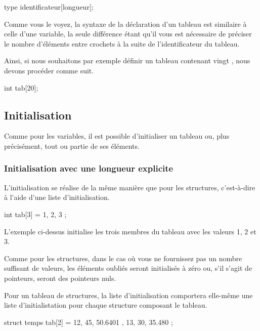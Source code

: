 \begin{C}
type identificateur[longueur];
\end{C}

Comme vous le voyez, la syntaxe de la déclaration d'un tableau est
similaire à celle d'une variable, la seule différence étant qu'il vous
est nécessaire de préciser le nombre d'éléments entre crochets à la
suite de l'identificateur du tableau.

Ainsi, si nous souhaitons par exemple définir un tableau contenant vingt
, nous devons procéder comme suit.

\begin{C}
int tab[20];
\end{C}

\subsection{Initialisation}
\label{initialisation-4}

Comme pour les variables, il est possible d'initialiser un tableau ou,
plus précisément, tout ou partie de ses éléments.

\subsubsection{Initialisation avec une longueur explicite}
\label{initialisation-avec-une-longueur-explicite-1}

L'initialisation se réalise de la même manière que pour les structures,
c'est-à-dire à l'aide d'une liste d'initialisation.

\begin{C}
int tab[3] = { 1, 2, 3 };
\end{C}

L'exemple ci-dessus initialise les trois membres du tableau avec les
valeurs 1, 2 et 3.

\begin{attentionbox}
  Comme pour les structures, dans le cas
où vous ne fournissez pas un nombre suffisant de valeurs, les éléments
oubliés seront initialisés à zéro ou, s'il s'agit de pointeurs, seront
des pointeurs nuls.
\end{attentionbox}


Pour un tableau de structures, la liste d'initialisation comportera
elle-même une liste d'initialistation pour chaque structure composant le
tableau.

\begin{C}
struct temps tab[2] = { { 12, 45, 50.6401 }, { 13, 30, 35.480 } } ;
\end{C}

